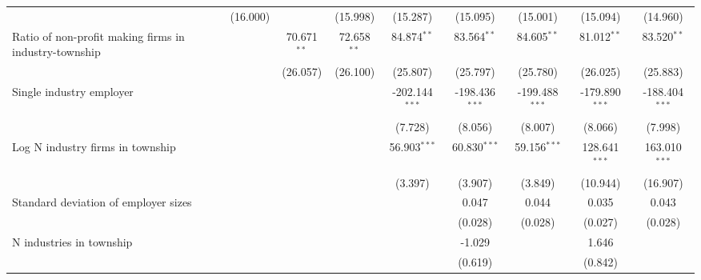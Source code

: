 \begin{tabular}{lcccccccc}
                                                         & (16.000)        &                 & (15.998)        & (15.287)         & (15.095)         & (15.001)         & (15.094)         & (14.960)\\   
   Ratio of non-profit making firms in industry-township &                 & 70.671$^{**}$   & 72.658$^{**}$   & 84.874$^{**}$    & 83.564$^{**}$    & 84.605$^{**}$    & 81.012$^{**}$    & 83.520$^{**}$\\   
                                                         &                 & (26.057)        & (26.100)        & (25.807)         & (25.797)         & (25.780)         & (26.025)         & (25.883)\\   
   Single industry employer                              &                 &                 &                 & -202.144$^{***}$ & -198.436$^{***}$ & -199.488$^{***}$ & -179.890$^{***}$ & -188.404$^{***}$\\   
                                                         &                 &                 &                 & (7.728)          & (8.056)          & (8.007)          & (8.066)          & (7.998)\\   
   Log N industry firms in township                      &                 &                 &                 & 56.903$^{***}$   & 60.830$^{***}$   & 59.156$^{***}$   & 128.641$^{***}$  & 163.010$^{***}$\\   
                                                         &                 &                 &                 & (3.397)          & (3.907)          & (3.849)          & (10.944)         & (16.907)\\   
   Standard deviation of employer sizes                  &                 &                 &                 &                  & 0.047            & 0.044            & 0.035            & 0.043\\   
                                                         &                 &                 &                 &                  & (0.028)          & (0.028)          & (0.027)          & (0.028)\\   
   N industries in township                              &                 &                 &                 &                  & -1.029           &                  & 1.646            &   \\   
                                                         &                 &                 &                 &                  & (0.619)          &                  & (0.842)          &   \\   

\end{tabular}
